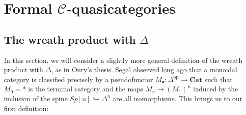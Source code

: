 \documentclass[leqno]{article}
\numberwithin{equation}{subsection}
\theoremstyle{plain}   %
\theoremstyle{remark}
\theoremstyle{plain}
\newcommand{\op}{\ensuremath{\mathrm{op}}}
\newcommand{\Cat}{\ensuremath{\mathbf{Cat}}}
\newcommand{\C}{\ensuremath{\mathcal{C}}}
\begin{document}

\section{Formal \(\C\)-quasicategories}
\subsection{The wreath product with \(\Delta\)}
In this section, we will consider a slightly more general definition of the wreath product with \(\Delta\), as in Oury's thesis. Segal observed long ago that a monoidal category is classified precisely by a pseudofunctor \(M_\bullet:\Delta^\op\to \Cat\) such that \(M_0=\ast\) is the terminal category and the maps \(M_n \to {(M_1)}^n\) induced by the inclusion of the spine \(Sp[n]\hookrightarrow \Delta^n\) are all isomorphisms.  This brings us to our first definition:
\end{document}
